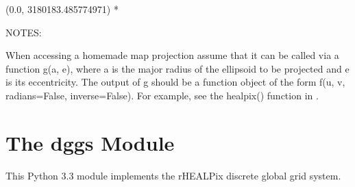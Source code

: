 \documentclass[a4paper,12ptopenany,oneside,english]{sphinxmanual}
\begin{document}
\begin{fulllineitems}
\begin{sphinxVerbatim}[commandchars=\\\{\}]
   
     
  
   
  
\end{sphinxVerbatim}
\begin{description}
\sphinxAtStartPar
(0.0, 3180183.485774971) *

\end{description}

\sphinxAtStartPar
NOTES:

\sphinxAtStartPar
When accessing a homemade map projection assume that it can be called via
a function g(a, e), where a is the major radius of the ellipsoid to be
projected and e is its eccentricity.
The output of g should be a function object of the form
f(u, v, radians=False, inverse=False).
For example, see the healpix() function in .

\end{fulllineitems}


\sphinxstepscope


\chapter{The dggs Module}
\label{\detokenize{dggs:module-rhealpixdggs.dggs}}\label{\detokenize{dggs:the-dggs-module}}\label{\detokenize{dggs::doc}}
\sphinxAtStartPar
This Python 3.3 module implements the rHEALPix discrete global grid system.
\end{document}
